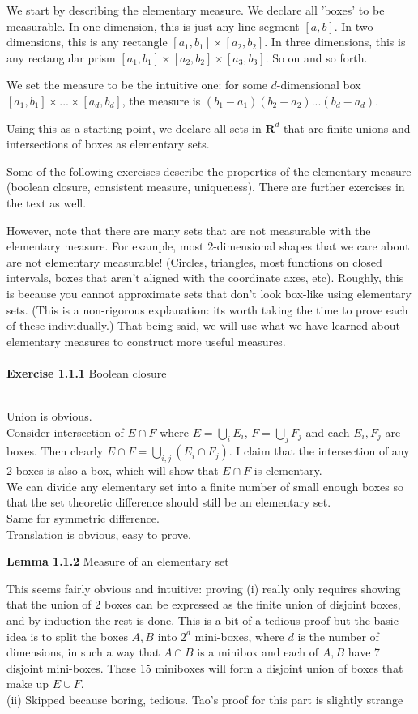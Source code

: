 \documentclass[answers,12pt]{exam}
\begin{document}
We start by describing the elementary measure.
We declare all 'boxes' to be measurable.
In one dimension, this is just any line segment $[a,b]$.
In two dimensions, this is any rectangle $[a_1,b_1] \times [a_2, b_2]$.
In three dimensions, this is any rectangular prism $[a_1,b_1] \times [a_2, b_2] \times [a_3,b_3]$.
So on and so forth.

We set the measure to be the intuitive one: for some $d$-dimensional box $[a_1,b_1] \times ... \times [a_d,b_d]$, the measure is $(b_1-a_1)(b_2-a_2)...(b_d-a_d)$.

Using this as a starting point, we declare all sets in $\mathbf{R}^d$ that are finite unions and intersections of boxes as elementary sets.

Some of the following exercises describe the properties of the elementary measure (boolean closure, consistent measure, uniqueness).
There are further exercises in the text as well.

However, note that there are many sets that are not measurable with the elementary measure.
For example, most 2-dimensional shapes that we care about are not elementary measurable!
(Circles, triangles, most functions on closed intervals, boxes that aren't aligned with the coordinate axes, etc).
Roughly, this is because you cannot approximate sets that don't look box-like using elementary sets.
(This is a non-rigorous explanation: its worth taking the time to prove each of these individually.)
That being said, we will use what we have learned about elementary measures to construct more useful measures.
\\ \\
\textbf{Exercise 1.1.1} Boolean closure
\begin{solution}\\
Union is obvious.\\
Consider intersection of $E \cap F$ where $E = \bigcup_i E_i$, $F = \bigcup_j F_j$ and each $E_i, F_j$ are boxes.
Then clearly $E \cap F = \bigcup_{i,j}(E_i \cap F_j)$.
I claim that the intersection of any 2 boxes is also a box, which will show that $E \cap F$ is elementary. \\
We can divide any elementary set into a finite number of small enough boxes so that the set theoretic difference should still be an elementary set.\\
Same for symmetric difference.\\
Translation is obvious, easy to prove.
\end{solution}
\textbf{Lemma 1.1.2} Measure of an elementary set 
\begin{solution}
This seems fairly obvious and intuitive: proving (i) really only requires showing that the union of 2 boxes can be expressed as the finite union of disjoint boxes, and by induction the rest is done. 
This is a bit of a tedious proof but the basic idea is to split the boxes $A,B$ into $2^d$ mini-boxes, where $d$ is the number of dimensions, in such a way that $A\cap B$ is a minibox and each of $A,B$ have 7 disjoint mini-boxes. 
These 15 miniboxes will form a disjoint union of boxes that make up $E \cup F$. \\
(ii) Skipped because boring, tedious.
Tao's proof for this part is slightly strange
\end{solution}
\end{document}
